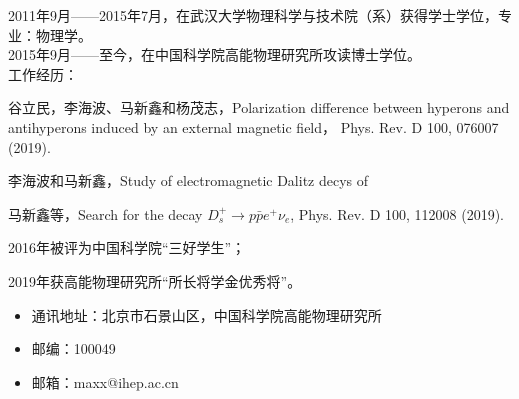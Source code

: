 \begin{resume}


\noindent
2011年9月——2015年7月，在武汉大学物理科学与技术院（系）获得学士学位，专业：物理学。\\
\noindent
2015年9月——至今，在中国科学院高能物理研究所攻读博士学位。\\
\noindent
工作经历：\\
    \begin{enumerate}[{[}1{]}]
    \item 谷立民，李海波、马新鑫和杨茂志，Polarization difference between hyperons and antihyperons induced by an 
    external magnetic field， Phys. Rev. D 100, 076007 (2019).
    \item 李海波和马新鑫，Study of electromagnetic Dalitz decys of 
    \item 马新鑫等，Search for the decay $D_{s}^{+} \to p \bar{p} e^{+}
        \nu_{e}$, Phys. Rev. D 100, 112008 (2019).
  \end{enumerate}


  \begin{enumerate}[{[}1{]}]
  \item  2016年被评为中国科学院“三好学生”；
  \item  2019年获高能物理研究所“所长将学金优秀将”。
  \end{enumerate}
    \begin{itemize}
        \item 通讯地址：北京市石景山区，中国科学院高能物理研究所
        \item 邮编：100049
        \item 邮箱：maxx@ihep.ac.cn
    \end{itemize}
  
\end{resume}
